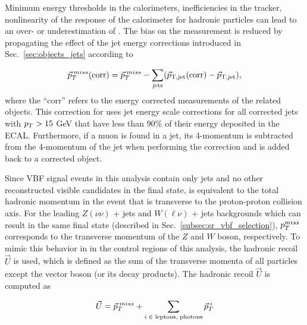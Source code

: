 Minimum energy thresholds in the calorimeters, inefficiencies
in the tracker, nonlinearity of the response of the calorimeter
for hadronic particles can lead to an over- or underestimation of \ptmiss.
The bias on the \ptmiss measurement is reduced by propagating the effect of the jet energy
corrections introduced in Sec.~\ref{sec:objects_jets} according to

\begin{equation}
\vec{p}_{T}^{\;miss}(\mathrm{corr})
=\vec{p}_{T}^{\;miss} - \sum_\mathrm{jets} (\vec{p}_\mathrm{T,jet}({\mathrm{corr}})-\vec{p}_\mathrm{T,jet}),
\label{eq:Type1MET}
\end{equation}
where the ``corr'' refers to the energy corrected measurements
of the related objects.
This correction for \ptvecmiss uses jet energy scale corrections
for all corrected jets with $p_T > 15$ GeV that have less than $90 \%$
of their energy deposited in the ECAL. Furthermore, if a muon is found in a
jet, its 4-momentum is subtracted from the 4-momentum of the jet
when performing the correction and is added back to a corrected object.

Since VBF \hinv signal events in this analysis contain only jets and no other 
reconstructed visible candidates in the final state,
\ptmiss is equivalent to the total hadronic momentum in the event that is transverse to the proton-proton collision axis. 
For the leading $Z(\nu\nu)$ + jets and $W(\ell\nu)$ + jets backgrounds which can result in the same final state 
(described in Sec.~\ref{subsec:sr_vbf_selection}), 
$p_T^{miss}$ corresponds to the transverse momentum of the $Z$ and $W$ boson, respectively. 
To mimic this behavior in in the control regions of this analysis, the hadronic recoil
$\vec{U}$ is used, which is defined as the sum of the transverse
momenta of all particles except the vector boson (or its decay products).
The hadronic recoil $\vec{U}$ is computed as

\begin{equation}
  \vec{U} = \vec{p}_{T}^{\;miss} + \sum _{i\;\in\;\textrm{leptons, photons}}\vec{p}_{T}^{\;i}
  \label{eq:recoil_def}
\end{equation}

